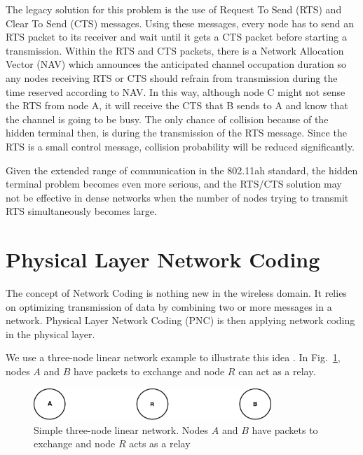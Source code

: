 The legacy solution for this problem is the use of Request To Send (RTS) and Clear To Send (CTS) messages. Using these messages, every node has to send an RTS packet to its receiver and wait until it gets a CTS packet before starting a transmission. Within the RTS and CTS packets, there is a Network Allocation Vector (NAV) which announces the anticipated channel occupation duration so any nodes receiving RTS or CTS should refrain from transmission during the time reserved according to NAV. In this way, although node C might not sense the RTS from node A, it will receive the CTS that B sends to A and know that the channel is going to be busy. The only chance of collision because of the hidden terminal then, is during the transmission of the RTS message. Since the RTS is a small control message, collision probability will be reduced significantly. 

Given the extended range of communication in the 802.11ah standard, the hidden terminal problem becomes even more serious, and the RTS/CTS solution may not be effective in dense networks when the number of nodes trying to transmit RTS simultaneously becomes large.



\section{Physical Layer Network Coding}

The concept of Network Coding is nothing new in the wireless domain. It relies on optimizing transmission of data by combining two or more messages in a network. Physical Layer Network Coding (PNC) is then applying network coding in the physical layer.

We use a three-node linear network example to illustrate this idea \cite{zhang2006hot}. In Fig.~\ref{fig:justThreeNodes}, nodes $A$ and $B$ have packets to exchange and node $R$ can act as a relay.


\begin{figure} [th]
    \centering
    \includegraphics[width=0.8\textwidth]{figures/justThreeNodes.pdf}
    \caption{Simple three-node linear network. Nodes $A$ and $B$ have packets to exchange and node $R$ acts as a relay} \label{fig:justThreeNodes}
\end{figure}

